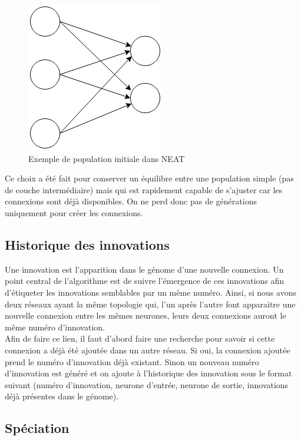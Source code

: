 \documentclass{article}
\begin{document}
\begin{figure}[H]
\begin{center}
	\includegraphics[scale=0.6]{initneat.png}
	\caption{Exemple de population initiale dans NEAT}
\end{center}
\end{figure}

Ce choix a été fait pour conserver un équilibre entre une population simple (pas de couche intermédiaire) mais qui est rapidement capable de s'ajuster car les connexions sont déjà disponibles. On ne perd donc pas de générations uniquement pour créer les connexions.

\subsection{Historique des innovations}

Une innovation est l'apparition dans le génome d'une nouvelle connexion. Un point central de l'algorithme est de suivre l'émergence de ces innovations afin d'étiqueter les innovations semblables par un même numéro. Ainsi, si nous avons deux réseaux ayant la même topologie qui, l'un après l'autre font apparaitre une nouvelle connexion entre les mêmes neurones, leurs deux connexions auront le même numéro d'innovation.\\
	
Afin de faire ce lien, il faut d'abord faire une recherche pour savoir si cette connexion a déjà été ajoutée dans un autre réseau. Si oui, la connexion ajoutée prend le numéro d'innovation déjà existant. Sinon un nouveau numéro d'innovation est généré et on ajoute à l'historique des innovation sous le format suivant (numéro d'innovation, neurone d'entrée, neurone de sortie, innovations déjà présentes dans le génome).\\

\subsection{Spéciation}
\end{document}

